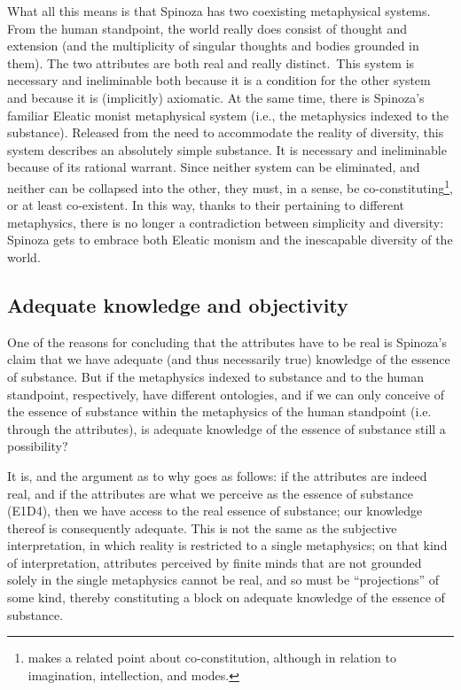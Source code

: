\documentclass[11pt]{article}
\newcommand\simplecite[1]{(#1)}
\begin{document}
	What all this means is that Spinoza has two coexisting metaphysical systems. From the human standpoint, the world really does consist of thought and extension (and the multiplicity of singular thoughts and bodies grounded in them). The two attributes are both real and really distinct.\ This system is necessary and ineliminable both because it is a condition for the other system and because it is (implicitly) axiomatic. At the same time, there is Spinoza's familiar Eleatic monist metaphysical system (i.e., the metaphysics indexed to the substance). Released from the need to accommodate the reality of diversity, this system describes an absolutely simple substance. It is necessary and ineliminable because of its rational warrant. Since neither system can be eliminated, and neither can be collapsed into the other, they must, in a sense, be co-constituting\footnote{\textcite[76]{Schliesser2011} makes a related point about co-constitution, although in relation to imagination, intellection, and modes.}, or at least co-existent. In this way, thanks to their pertaining to different metaphysics, there is no longer a contradiction between simplicity and diversity: Spinoza gets to embrace both Eleatic monism and the inescapable diversity of the world.
	
	\subsection{Adequate knowledge and objectivity} \label{subsec:AdequateKnowledgeAndObjectivity}
	
	One of the reasons for concluding that the attributes have to be real is Spinoza's claim that we have adequate (and thus necessarily true) knowledge of the essence of substance. But if the metaphysics indexed to substance and to the human standpoint, respectively, have different ontologies, and if we can only conceive of the essence of substance within the metaphysics of the human standpoint (i.e. through the attributes), is adequate knowledge of the essence of substance still a possibility?
	
	It is, and the argument as to why goes as follows: if the attributes are indeed real, and if the attributes are what we perceive as the essence of substance \simplecite{E1D4}, then we have access to the real essence of substance; our knowledge thereof is consequently adequate. This is not the same as the subjective interpretation, in which reality is restricted to a single metaphysics; on that kind of interpretation, attributes perceived by finite minds that are not grounded solely in the single metaphysics cannot be real, and so must be \enquote{projections} of some kind, thereby constituting a block on adequate knowledge of the essence of substance.
	
\end{document}
